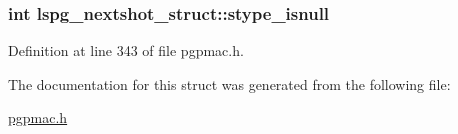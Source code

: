 \hypertarget{structlspg__nextshot__struct_a79f48c452a4aca8506bae22f897c7441}{
\subsubsection[{stype\-\_\-isnull}]{\setlength{\rightskip}{0pt plus 5cm}int lspg\-\_\-nextshot\-\_\-struct\-::stype\-\_\-isnull}}\label{structlspg__nextshot__struct_a79f48c452a4aca8506bae22f897c7441}


Definition at line 343 of file pgpmac.\-h.



The documentation for this struct was generated from the following file\-:\begin{DoxyCompactItemize}
\item 
\hyperlink{pgpmac_8h}{pgpmac.\-h}\end{DoxyCompactItemize}

